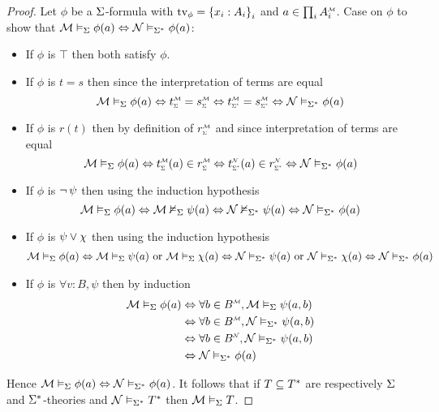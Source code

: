 \begin{proof}
    Let $\phi$ be a $\Sigma$-formula with $\textrm{tv}_{\phi} = \left\{x_i : A_i\right\}_i$ and 
    $a \in \prod_i \mmintp{A_i}$.
    Case on $\phi$ to show that 
    $\mathcal{M} \vDash_{\Sigma} \phi(a) \Leftrightarrow \mathcal{N} \vDash_{\Sigma^*} \phi(a)$:
    \begin{itemize}
        \item If $\phi$ is $\top$ then both satisfy $\phi$.
        \item If $\phi$ is $t = s$ then since the interpretation 
            of terms are equal
        \[
            \MM \model{\Si} \phi(a) \iff \subintp{\Si}{\MM}{t} = 
            \subintp{\Si}{\MM}{s}
            \iff \subintp{\Si^*}{\MM}{t} = \subintp{\Si^*}{\MM}{s} 
            \iff \NN \model{\Si^*} \phi(a)
        \]
        \item If $\phi$ is $r(t)$ then by definition of
        $\subintp{\Si}{\MM}{r}$ and since interpretation 
        of terms are equal
        \[
            \MM \model{\Si} \phi(a) \iff \subintp{\Si}{\MM}{t}(a) 
            \in \subintp{\Si}{\MM}{r}
            \iff \subintp{\Si^*}{\NN}{t}(a) \in 
            \subintp{\Si^*}{\NN}{r}
            \iff \NN \model{\Si^*} \phi(a) 
        \]
        \item If $\phi$ is $\neg\, \psi$ then using the induction hypothesis
            \[
                \mathcal{M} \vDash_{\Sigma} \phi(a) \Leftrightarrow \mathcal{M} \nvDash_{\Sigma} \psi(a)
                \Leftrightarrow \mathcal{N} \nvDash_{\Sigma^*} \psi(a)
                \Leftrightarrow \mathcal{N} \vDash_{\Sigma^*} \phi(a) 
            \]
        \item If $\phi$ is $\psi \lor \chi$ then using the induction hypothesis
            \begin{align*}
                \mathcal{M} \vDash_{\Sigma} \phi(a) \Leftrightarrow \mathcal{M} \vDash_{\Sigma} \psi(a) 
                \text{ or } \mathcal{M} \vDash_{\Sigma} \chi(a)
                \Leftrightarrow \mathcal{N} \vDash_{\Sigma^*} \psi(a) \text{ or } 
                \mathcal{N} \vDash_{\Sigma^*} \chi(a)
                \Leftrightarrow \mathcal{N} \vDash_{\Sigma^*} \phi(a) 
            \end{align*}
        \item If $\phi$ is $\forall v : B, \psi$ then by induction
        \begin{align*}
            \MM \model{\Si} \phi(a) &\iff \forall b \in \mmintp{B}, 
            \MM \model{\Si} \psi(a,b)\\
                &\iff \forall b \in \mmintp{B}, \NN \model{\Si^*} \psi(a,b)\\
                &\iff \forall b \in \nnintp{B}, \NN \model{\Si^*} \psi(a,b)\\
                & \iff \NN \model{\Si^*} \phi(a) 
        \end{align*}
    \end{itemize}
    Hence $\mathcal{M} \vDash_{\Sigma} \phi(a) \Leftrightarrow \mathcal{N} \vDash_{\Sigma^*} \phi(a)$.
    It follows that if $T \subseteq T^*$ are respectively $\Sigma$ and $\Sigma^*$-theories 
    and $\mathcal{N} \vDash_{\Sigma^*} T^*$ then $\mathcal{M} \vDash_{\Sigma} T$.
\end{proof}

